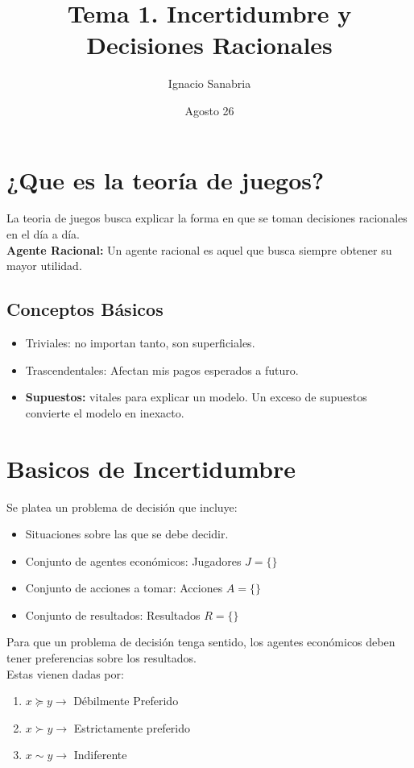\documentclass[12pt]{article}
\title{Tema 1. Incertidumbre y Decisiones Racionales}
\author{Ignacio Sanabria}
\date{Agosto 26}
\begin{document}
\maketitle

\section{¿Que es la teoría de juegos?}
La teoria de juegos busca explicar la forma en que se toman decisiones racionales en el día a día. \\
\textbf{Agente Racional:} Un agente racional es aquel que busca siempre obtener su mayor utilidad. \\
\subsection{Conceptos Básicos}
\begin{itemize}
    \item Triviales: no importan tanto, son superficiales.
    \item Trascendentales: Afectan mis pagos esperados a futuro. 
    \item \textbf{Supuestos:} vitales para explicar un modelo. Un exceso de supuestos convierte el modelo en inexacto. 
\end{itemize}

\section{Basicos de Incertidumbre}
Se platea un problema de decisión que incluye: 
\begin{itemize}
    \item Situaciones sobre las que se debe decidir. 
    \item Conjunto de agentes económicos: Jugadores $J=\{\}$
    \item Conjunto de acciones a tomar: Acciones $A=\{\}$
    \item Conjunto de resultados: Resultados $R=\{\}$
\end{itemize}
Para que un problema de decisión tenga sentido, los agentes económicos deben tener preferencias sobre los resultados. \\
Estas vienen dadas por: 
\begin{enumerate}
    \item $x\succeq y \xrightarrow{}$ Débilmente Preferido 
    \item $x\succ y \xrightarrow{}$ Estrictamente preferido
    \item $x\sim y \xrightarrow{}$ Indiferente
\end{enumerate}
\end{document}

